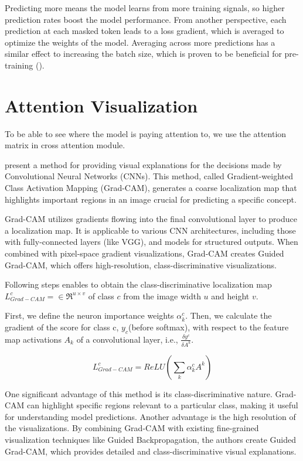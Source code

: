 Predicting more means the model learns from more training signals, so higher prediction rates boost the model performance. From another perspective, each prediction at each masked token leads to a loss gradient, which is averaged to optimize the weights of the model. Averaging across more predictions has a similar effect to increasing the batch size, which is proven to be beneficial for pre-training (\cite{liu2019robertarobustlyoptimizedbert}). 

\section{Attention Visualization}
To be able to see where the model is paying attention to, we use the attention matrix in cross attention module. 

\cite{gradcam} present a method for providing visual explanations for the decisions made by Convolutional Neural Networks (CNNs). This method, called Gradient-weighted Class Activation Mapping (Grad-CAM), generates a coarse localization map that highlights important regions in an image crucial for predicting a specific concept.

Grad-CAM utilizes gradients flowing into the final convolutional layer to produce a localization map. It is applicable to various CNN architectures, including those with fully-connected layers (like VGG), and models for structured outputs. When combined with pixel-space gradient visualizations, Grad-CAM creates Guided Grad-CAM, which offers high-resolution, class-discriminative visualizations.

Following steps enables to obtain the class-discriminative localization map $L^c_{Grad-CAM} = \in\Re^{u \times v}$ of class $c$ from the image width $u$ and height $v$. 

First, we define the neuron importance weights $\alpha^c_k$. Then, we calculate the gradient of the score for class c, $y_c$(before softmax), with respect to the feature map activations $A_k$ of a convolutional layer, i.e., $\frac{\delta y^c}{\delta A^k}$. 
 
\begin{displaymath}
    L^c_{Grad-CAM} = ReLU(\sum_k\alpha^c_kA^k)
\end{displaymath}

One significant advantage of this method is its class-discriminative nature. Grad-CAM can highlight specific regions relevant to a particular class, making it useful for understanding model predictions. Another advantage is the high resolution of the visualizations. By combining Grad-CAM with existing fine-grained visualization techniques like Guided Backpropagation, the authors create Guided Grad-CAM, which provides detailed and class-discriminative visual explanations.

